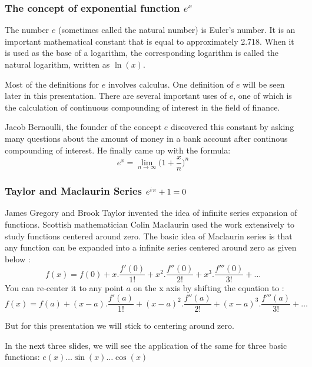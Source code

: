 \documentclass[10pt]{beamer}
\newcommand{\iu}{{i\mkern1mu}}
\begin{document}
\begin{frame}
	\frametitle{The concept of exponential function $e^x$}
	
The number $e$ (sometimes called the natural number) is Euler's number. It is an important mathematical constant that is equal to approximately 2.718. When it is used as the base of a logarithm, the corresponding logarithm is called the natural logarithm, written as $\ln(x)$. \vspace{10pt}

Most of the definitions for $e$ involves calculus. One definition of $e$ will be seen later in this presentation. There are several important uses of $e$, one of which is the calculation of continuous compounding of interest in the field of finance. \vspace{10pt}

Jacob Bernoulli, the founder of the concept $e$ discovered this constant by asking many questions about the amount of money in a bank account after continous compounding of interest. He finally came up with the formula: \\

$$e^x = \lim_{n\to\infty}\Big(1+\dfrac{x}{n}\Big)^n$$
	
\end{frame}
\begin{frame}
	\frametitle{Taylor and Maclaurin Series \hspace{25pt} \textcolor{pink}{\Huge\(e^{\iu \pi} +1 = 0\)}}
	James Gregory and Brook Taylor invented the idea of infinite series expansion of functions.  Scottish mathematician Colin Maclaurin used the work extensively to study functions centered around zero.  The basic idea of Maclaurin series is that any function can be expanded into a infinite series centered around zero as given below :
	{\large {$$f(x) = f(0)+x.\dfrac{f'(0)}{1!}+ x^2.\dfrac{f''(0)}{2!} +x^3.\dfrac{f'''(0)}{3!} + \dots$$}}
	You can re-center it to any point $a$ on the x axis by shifting the equation to  :
	{\large {$$f(x) = f(a)+(x-a).\dfrac{f'(a)}{1!}+ (x-a)^2.\dfrac{f''(a)}{2!} +(x-a)^3.\dfrac{f'''(a)}{3!} + \dots$$}}
	
	But for this presentation we will stick to centering around zero. 
	\vspace{10pt}

	In the next three slides, we will see the application of the same for three basic functions: $e(x) \dots \sin(x) \dots \cos(x)$
\end{frame}
\end{document}
